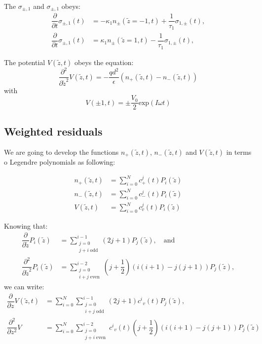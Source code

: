 \documentclass[amsmath,amsfonts,amssymb,superscriptaddress,showkeys,notitlepage,onecolumn]{revtex4-1}
\newcommand{\dpartial}[1]{\ensuremath{\dfrac{\partial}{\partial #1}}}
\newcommand{\ddpartial}[1]{\ensuremath{\dfrac{\partial^2}{\partial #1^2}}}
\newcommand{\Np}{\ensuremath{n_{+}(\tilde{z},t)}}
\newcommand{\Nm}{\ensuremath{n_{-}(\tilde{z},t)}}
\newcommand{\V}{\ensuremath{V(\tilde{z},t)}}
\newcommand{\legP}[1]{\ensuremath{P_{#1}(\tilde{z})}}
\begin{document}
The $\sigma_{\pm,1}$ and $\sigma_{\pm,1}$ obeys:
\begin{align}\nonumber
  \dfrac{\partial}{\partial t} \sigma_{\pm,1}(t)&=-\kappa_1 n_{\pm}(\tilde{z}=-1,t)+\dfrac{1}{\tau_1} \sigma_{1,\pm}(t),\\
  \dfrac{\partial}{\partial t} \sigma_{\pm,1}(t)&=\kappa_1 n_{\pm}(\tilde{z}=1,t)-\dfrac{1}{\tau_1} \sigma_{1,\pm}(t),
\end{align}

The potential $V(\tilde{z},t)$ obeys the equation:
\begin{equation}
  \ddpartial{\tilde{z}} V(\tilde{z},t) =-\dfrac{q d^2}{\epsilon}(\Np-\Nm)
\end{equation}
with
\begin{equation}
  V\left(\pm 1 ,t \right)=\pm \dfrac{V_0}{2} \text{exp}(I \omega t)
\end{equation}

\subsection{Weighted residuals}

We are going to develop the functions $\Np$, $\Nm$ and $\V$ in terms o Legendre polynomials as following:

\begin{align}\nonumber
  \Np&=\sum_{i=0}^N  c^j_{+}(t) \legP{i}\\
  \Nm&=\sum_{i=0}^N  c^j_{-}(t) \legP{i}\\ \nonumber
  \V&=\sum_{i=0}^N   c^j_{v}(t) \legP{i}
\end{align}


Knowing that:
\begin{align}\nonumber
  \dpartial{\tilde{z}} \legP{i}&=\sum_{\substack{j=0 \\  j+i \; \text{odd}}}^{i-1} (2j+1) \legP{j}, \quad \text{and}\\
  \ddpartial{\tilde{z}} \legP{i}&=\sum_{\substack{j=0 \\  i+j \; \text{even}}}^{i-2} \left(j+\dfrac{1}{2} \right) \left(i(i+1)-j(j+1) \right) \legP{j},
\end{align}
we can write:
\begin{align}\label{eq:ddV}\nonumber
  \dpartial{z} \V&=\sum_{i=0}^{N} \sum_{\substack{j=0 \\  i+j \; \text{odd}}}^{i-1} (2j+1) {c^i}_v(t) \legP{j},\\
\ddpartial{z}  V&=\sum_{i=0}^{N} \sum_{\substack{j=0 \\  j+i \; \text{even}}}^{i-2} {c^i}_v(t) \left(j+\dfrac{1}{2} \right) \left(i(i+1)-j(j+1) \right)  \legP{j}
\end{align}
\end{document}
